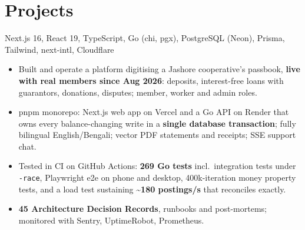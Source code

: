 \documentclass[10pt,a4paper]{article}
\begin{document}
\section{Projects}
{ \textbar{} }
{Next.js 16, React 19, TypeScript, Go (chi, pgx), PostgreSQL (Neon), Prisma, Tailwind, next-intl, Cloudflare}
{\begin{itemize}
  \item Built and operate a platform digitising a Jashore cooperative's passbook, \textbf{live with real members since Aug 2026}: deposits, interest-free loans with guarantors, donations, disputes; member, worker and admin roles.
  \item pnpm monorepo: Next.js web app on Vercel and a Go API on Render that owns every balance-changing write in a \textbf{single database transaction}; fully bilingual English/Bengali; vector PDF statements and receipts; SSE support chat.
  \item Tested in CI on GitHub Actions: \textbf{269 Go tests} incl.\ integration tests under \texttt{-race}, Playwright e2e on phone and desktop, 400k-iteration money property tests, and a load test sustaining \textbf{\textasciitilde180 postings/s} that reconciles exactly.
  \item \textbf{45 Architecture Decision Records}, runbooks and post-mortems; monitored with Sentry, UptimeRobot, Prometheus.
\end{itemize}}












\end{document}
